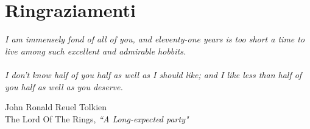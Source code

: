 \chapter*{Ringraziamenti}
\setlength{\epigraphwidth}{0.55\textwidth}
\renewcommand{\epigraphflush}{flushright}
\renewcommand{\sourceflush}{flushright}
\epigraph{
\textit{I am immensely fond of all of you, and eleventy-one years is too short a
time to live among such excellent and admirable hobbits.\\
\phantom{\footnotesize miao}\\
I don't know half of you half as well as I should like; and I like less than
half of you half as well as you deserve.}}{John Ronald Reuel Tolkien \\
The Lord Of The Rings, \textit{``A Long-expected party"}}
\lipsum[1-3]
